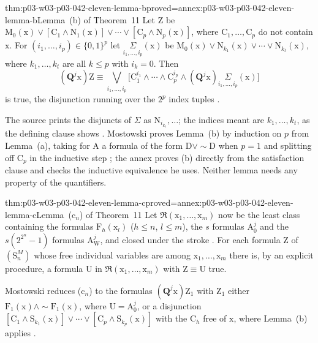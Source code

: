 \begin{hblemma}{thm:p03-w03-p03-042-eleven-lemma-b}{proved=annex:p03-w03-p03-042-eleven-lemma-b}{Lemma~(b) of Theorem~11}
Let \(\mathrm Z\) be \(\mathrm M_0(\mathrm x)\vee[\mathrm C_1\wedge
\mathrm N_1(\mathrm x)]\vee\cdots\vee[\mathrm C_p\wedge\mathrm
N_p(\mathrm x)]\), where \(\mathrm C_1,\ldots,\mathrm C_p\) do not contain
\(\mathrm x\).  For \((i_1,\ldots,i_p)\in\{0,1\}^p\) let
\(\underset{i_1,\ldots,i_p}{\Sigma}(\mathrm x)\) be \(\mathrm
M_0(\mathrm x)\vee\mathrm N_{k_1}(\mathrm x)\vee\cdots\vee\mathrm
N_{k_t}(\mathrm x)\), where \(k_1,\ldots,k_t\) are all \(k\leq p\) with
\(i_k=0\).  Then
\[
 (\mathbf Q^j\mathrm x)\mathrm Z\equiv\bigvee_{i_1,\ldots,i_p}
 \bigl[\mathrm C_1^{i_1}\wedge\cdots\wedge\mathrm C_p^{i_p}\wedge
 (\mathbf Q^j\mathrm x)\underset{i_1,\ldots,i_p}{\Sigma}(\mathrm x)\bigr]
\]
is true, the disjunction running over the \(2^p\) index tuples
\cite[p.~32]{Mostowski1957}.
\end{hblemma}

The source prints the disjuncts of \(\Sigma\) as \(\mathrm
N_{i_{k_1}},\ldots\); the indices meant are \(k_1,\ldots,k_t\), as the
defining clause shows \cite[p.~32]{Mostowski1957}.  Mostowski proves
Lemma~(b) by induction on \(p\) from Lemma~(a), taking for \(\mathrm A\) a
formula of the form \(\mathrm D\vee{\sim}\mathrm D\) when \(p=1\) and
splitting off \(\mathrm C_p\) in the inductive step
\cite[pp.~32--33]{Mostowski1957}; the annex proves (b) directly from the
satisfaction clause and checks the inductive equivalence he uses.  Neither
lemma needs any property of the quantifiers.

\begin{hblemma}{thm:p03-w03-p03-042-eleven-lemma-c}{proved=annex:p03-w03-p03-042-eleven-lemma-c}{Lemma~(\(\mathrm c_n\)) of Theorem~11}
Let \(\mathfrak R(\mathrm x_1,\ldots,\mathrm x_m)\) now be the least class
containing the formulas \(\mathrm F_h(\mathrm x_l)\) (\(h\leq n\),
\(l\leq m\)), the \(s\) formulas \(\mathrm A^j_0\) and the
\(s(2^{2^n}-1)\) formulas \(\mathrm A^j_{\mathrm W}\), and closed under the
stroke \cite[p.~33]{Mostowski1957}.  For each formula \(\mathrm Z\) of
\((\mathrm S^M_n)\) whose free individual variables are among \(\mathrm
x_1,\ldots,\mathrm x_m\) there is, by an explicit procedure, a formula
\(\mathrm U\) in \(\mathfrak R(\mathrm x_1,\ldots,\mathrm x_m)\) with
\(\mathrm Z\equiv\mathrm U\) true.
\end{hblemma}

Mostowski reduces (\(\mathrm c_n\)) to the formulas \((\mathbf Q^j\mathrm
x)\mathrm Z_1\) with \(\mathrm Z_1\) either \(\mathrm F_1(\mathrm x)\wedge
{\sim}\mathrm F_1(\mathrm x)\), where \(\mathrm U=\mathrm A^j_0\), or a
disjunction \([\mathrm C_1\wedge\mathrm S_{k_1}(\mathrm x)]\vee\cdots\vee
[\mathrm C_p\wedge\mathrm S_{k_p}(\mathrm x)]\) with the \(\mathrm C_h\)
free of \(\mathrm x\), where Lemma~(b) applies
\cite[p.~33]{Mostowski1957}.

